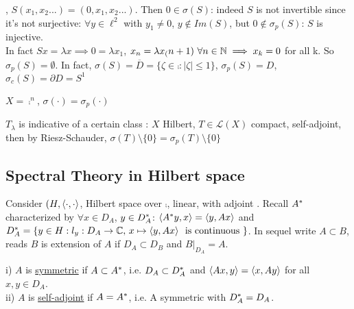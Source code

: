 \begin{example}\nl
	, $S(x_1,x_2...)=(0,x_1,x_2...)$. Then $0\in\sigma(S)$: indeed $S$ is not invertible since it's not surjective: $\forall y\in\ell^2$ with $y_1\neq0$, $ y\notin Im(S)$, but $0\notin\sigma_p(S)$: $S$ is injective.\\
	In fact $Sx=\lambda x\implies0=\lambda x_1$, $x_n=\lambda x_(n+1)\,\,\forall n\in\mathbb{N}\implies x_k=0$ for all k. So $\sigma_p(S)=\emptyset$. In fact, $\sigma(S)=\overline{D}=\{\zeta\in\comp:|\zeta|\leq1\}$, $\sigma_p(S)=D$, $\sigma_c(S)=\partial D=S^1$
\end{example}
\begin{example}\nl
	$X=\comp^n$, $\sigma(\cdot)=\sigma_p(\cdot)$
\end{example}
\begin{example}\nl
$T_\lambda$ is indicative of a certain class : $ X$ Hilbert, $T\in\mathcal{L}(X)$ compact, self-adjoint, then by Riesz-Schauder, $\sigma(T)\setminus\{0\}=\sigma_p(T)\setminus\{0\}
$
\end {example}


\subsection{Spectral Theory in Hilbert space}
Consider $(H,\left<{\cdot},{\cdot}\right>$, Hilbert space over $\comp$,  linear, with adjoint . Recall ${A}^*$ characterized by $\forall x\in D_A$, $y\in D_{A}^*$: $\left<{{A}^*y},{x}\right>=\left<{y},{Ax}\right>$ and $D_{A}^*=\{y\in H : l_y:D_A\to \mathbb{C},\,x\mapsto \left<{y},{Ax}\right>\,\text{ is continuous }\}$.
In sequel write $A\subset B$, reads $B$ is extension of $A$ if $D_A\subset D_B$ and $B|_{D_A}=A$.


\begin{definition}\nl
	i)  $A$ is {\underline{symmetric}} if $A\subset {A}^*$, i.e. $D_A\subset D_{A}^*$ and $\left<{Ax},{y}\right>=\left<{x},{Ay}\right>$ for all $x,y\in D_A$.\\
	ii) $A$ is {\underline{self-adjoint}} if $A={A}^*$, i.e. A symmetric with $D_{A}^*=D_A$.
\end{definition}

